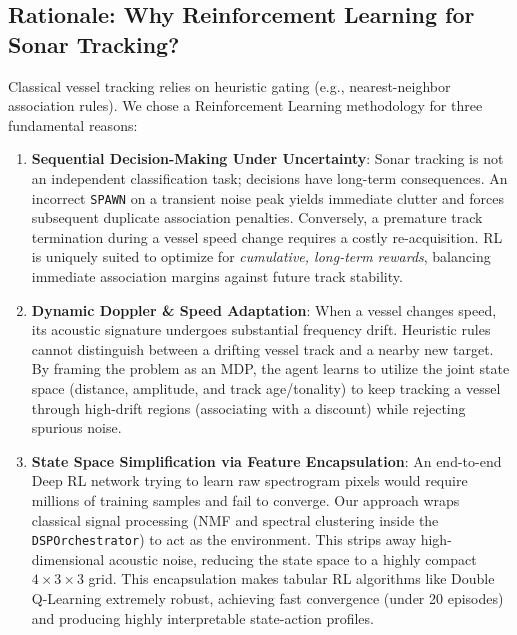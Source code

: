 \documentclass[12pt,a4paper]{article}
\begin{document}
\subsection{Rationale: Why Reinforcement Learning for Sonar Tracking?}
Classical vessel tracking relies on heuristic gating (e.g., nearest-neighbor association rules). We chose a Reinforcement Learning methodology for three fundamental reasons:
\begin{enumerate}
    \item \textbf{Sequential Decision-Making Under Uncertainty}: Sonar tracking is not an independent classification task; decisions have long-term consequences. An incorrect \texttt{SPAWN} on a transient noise peak yields immediate clutter and forces subsequent duplicate association penalties. Conversely, a premature track termination during a vessel speed change requires a costly re-acquisition. RL is uniquely suited to optimize for \textit{cumulative, long-term rewards}, balancing immediate association margins against future track stability.
    \item \textbf{Dynamic Doppler \& Speed Adaptation}: When a vessel changes speed, its acoustic signature undergoes substantial frequency drift. Heuristic rules cannot distinguish between a drifting vessel track and a nearby new target. By framing the problem as an MDP, the agent learns to utilize the joint state space (distance, amplitude, and track age/tonality) to keep tracking a vessel through high-drift regions (associating with a discount) while rejecting spurious noise.
    \item \textbf{State Space Simplification via Feature Encapsulation}: An end-to-end Deep RL network trying to learn raw spectrogram pixels would require millions of training samples and fail to converge. Our approach wraps classical signal processing (NMF and spectral clustering inside the \texttt{DSPOrchestrator}) to act as the environment. This strips away high-dimensional acoustic noise, reducing the state space to a highly compact $4 \times 3 \times 3$ grid. This encapsulation makes tabular RL algorithms like Double Q-Learning extremely robust, achieving fast convergence (under 20 episodes) and producing highly interpretable state-action profiles.
\end{enumerate}
\end{document}
